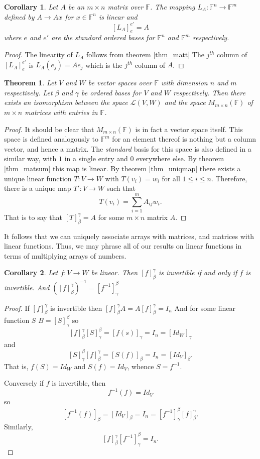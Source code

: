 \documentclass[oneside, 12pt]{book}
\newtheorem{thm}{Theorem}[section]
\newtheorem{cor}{Corollary}[section]
\theoremstyle{definition}
\begin{document}
\begin{cor}
  \label{cor_leftmult}
  Let $A$ be an $m \times n$ matrix over $\mathbb{F}$.
The mapping $L_{A}: \mathbb{F}^{n}\to \mathbb{F}^{m}$ defined by $A \to Ax$ for $x \in \mathbb{F}^{n}$ is linear and \[[L_{A}]_{e}^{e'}=A\] where $e$ and $e'$ are the standard ordered bases for $\mathbb{F}^{n}$ and $\mathbb{F}^{m}$ respectively.
\end{cor}
\begin{proof}
  The linearity of $L_{A}$ follows from theorem \ref{thm_matt} The $j^{th}$ column of $[L_{A}]_{e}^{e'}$ is $L_{A}(e_{j})=Ae_{j}$ which is the $j^{th}$ column of $A$.
\end{proof}
\begin{thm}
  \label{thm_matiso}
  Let $V$ and $W$ be vector spaces over $\mathbb{F}$ with dimension $n$ and $m$ respectively. Let $\beta$ and $\gamma$ be ordered bases for $V$ and $W$ respectively. Then there exists an isomorphism between the space $\mathcal{L}(V,W)$ and the space $M_{m \times n}(\mathbb{F})$ of $m \times n$ matrices with entries in $\mathbb{F}$.
\end{thm}
\begin{proof}
  It should be clear that $M_{m \times n}(\mathbb{F})$ is in fact a vector space itself. This space is defined analogously to $\mathbb{F}^{m}$ for an element thereof is nothing but a column vector, and hence a matrix. The \emph{standard} basis for this space is also defined in a similar way, with $1$ in a single entry and $0$ everywhere else.
  By theorem \ref{thm_matsum} this map is linear. By theorem \ref{thm_uniqmap} there exists a unique linear function $T: V \to W$ with $T(v_{i})=w_{i}$ for all $1 \leq i \leq n$. Therefore, there is a unique map $T':V \to W$ such that \[T(v_{i})=\sum_{i=1}^{m}A_{ij}w_{i}.\] That is to say that $[T]_{\beta}^{\gamma}=A$ for some $m \times n$ matrix $A$.
\end{proof}
It follows that we can uniquely associate arrays with matrices, and matrices with linear functions. Thus, we may phrase all of our results on linear functions in terms of multiplying arrays of numbers.
\begin{cor}
  \label{thm_matinv}
Let $f: V \to W$ be linear. Then $[f]_{\beta}^{\gamma}$ is invertible if and only if $f$ is invertible. And $([f]_{\beta}^{\gamma})^{-1}=[f^{-1}]_{\gamma}^{\beta}$
\end{cor}
\begin{proof}
  If $[f]_{\beta}^{\gamma}$ is invertible then $[f]_{\beta}^{\gamma}A=A[f]_{\beta}^{\gamma}=I_{n}$ And for some linear function $S$ $B=[S]_{\gamma}^{\beta}$ so
  \[[f]_{\beta}^{\gamma}[S]_{\gamma}^{\beta}=[f(s)]_{\gamma}=I_{n}=[Id_{W}]_{\gamma}\] and \[[S]_{\gamma}^{\beta}[f]_{\beta}^{\gamma}=[S(f)]_{\beta}=I_{n}=[Id_{V}]_{\beta}.\]
  That is, $f(S)=Id_{W}$ and $S(f)=Id_{V}$, whence $S=f^{-1}$.

  Conversely if $f$ is invertible, then \[f^{-1}(f)=Id_{V}\] so \[[f^{-1}(f)]_{\beta}=[Id_{V}]_{\beta}=I_{n}=[f^{-1}]_{\gamma}^{\beta}[f]_{\beta}^{\gamma}.\]Similarly, \[[f]_{\beta}^{\gamma}[f^{-1}]_{\gamma}^{\beta}=I_{n}.\]
\end{proof}
\end{document}
